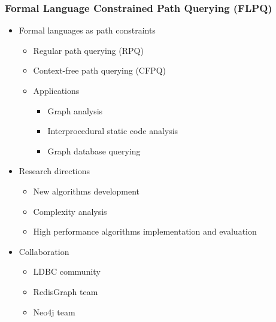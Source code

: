 \documentclass[xcolor=table,aspectratio=169]{beamer}
\begin{document}
\begin{frame}[fragile]
  \frametitle{Formal Language Constrained Path Querying (FLPQ)}
  \begin{itemize}
    \item Formal languages as path constraints 
    \begin{itemize}
      \item Regular path querying (RPQ)
      \item Context-free path querying (CFPQ)
    \end{itemize} 
    \begin{itemize}
    \item Applications 
    \begin{itemize}
      \item Graph analysis
      \item Interprocedural static code analysis
      \item Graph database querying
    \end{itemize}
  \end{itemize}
    \pause
    \item Research directions
    \begin{itemize}
      \item New algorithms development
      \item Complexity analysis
      \item High performance algorithms implementation and evaluation 
    \end{itemize}
    \pause
    \item Collaboration
    \begin{itemize}      
      \item LDBC community
      \item RedisGraph team
      \item Neo4j team
    \end{itemize}
  \end{itemize}
\end{frame}
\end{document}
